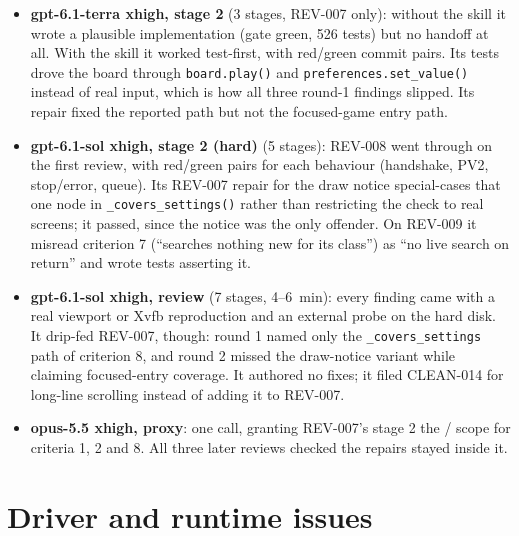 \documentclass[11pt,a4paper]{article}
\begin{document}
\begin{itemize}
  \item \textbf{gpt-6.1-terra xhigh, stage 2} (3 stages, REV-007 only): without the skill it wrote
        a plausible implementation (gate green, 526 tests) but no handoff at all. With the skill it
        worked test-first, with red/green commit pairs. Its tests drove the board through
        \texttt{board.play()} and \texttt{preferences.set\_value()} instead of real input, which is
        how all three round-1 findings slipped. Its repair fixed the reported path but not the
        focused-game entry path.
  \item \textbf{gpt-6.1-sol xhigh, stage 2 (hard)} (5 stages): REV-008 went through on the first
        review, with red/green pairs for each behaviour (handshake, PV2, stop/error, queue). Its
        REV-007 repair for the draw notice special-cases that one node in
        \texttt{\_covers\_settings()} rather than restricting the check to real screens; it
        passed, since the notice was the only offender. On REV-009 it misread criterion 7 (``searches
        nothing new for its class'') as ``no live search on return'' and wrote tests asserting it.
  \item \textbf{gpt-6.1-sol xhigh, review} (7 stages, 4--6~min): every finding came with a real
        viewport or Xvfb reproduction and an external probe on the hard disk. It drip-fed REV-007,
        though: round 1 named only the \texttt{\_covers\_settings} path of criterion 8, and round 2
        missed the draw-notice variant while claiming focused-entry coverage. It authored no fixes;
        it filed CLEAN-014 for long-line scrolling instead of adding it to REV-007.
  \item \textbf{opus-5.5 xhigh, proxy}: one call, granting REV-007's stage 2 the
        / scope for criteria 1, 2 and 8. All three later
        reviews checked the repairs stayed inside it.
\end{itemize}

\section*{Driver and runtime issues}
\end{document}
